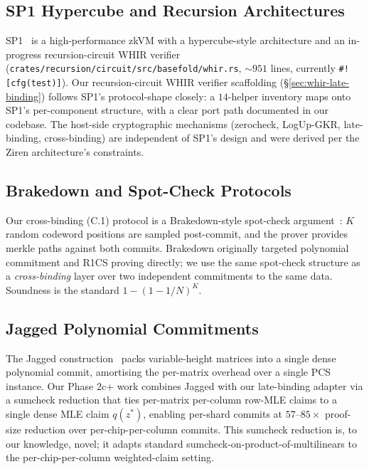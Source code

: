 \subsection{SP1 Hypercube and Recursion Architectures}

SP1~\cite{sp1-hypercube} is a high-performance zkVM with a
hypercube-style architecture and an in-progress recursion-circuit
WHIR verifier (\texttt{crates/recursion/circuit/src/basefold/whir.rs},
$\sim 951$ lines, currently \texttt{\#![cfg(test)]}).  Our
recursion-circuit WHIR verifier scaffolding (\S\ref{sec:whir-late-binding})
follows SP1's protocol-shape closely: a $14$-helper inventory
maps onto SP1's per-component structure, with a clear port path
documented in our codebase.  The host-side cryptographic mechanisms
(zerocheck, LogUp-GKR, late-binding, cross-binding) are independent
of SP1's design and were derived per the Ziren architecture's
constraints.

\subsection{Brakedown and Spot-Check Protocols}

Our cross-binding (C.1) protocol is a Brakedown-style spot-check
argument~\cite{brakedown}: $K$ random codeword positions are sampled
post-commit, and the prover provides merkle paths against both
commits.  Brakedown originally targeted polynomial commitment and
R1CS proving directly; we use the same spot-check structure as a
\emph{cross-binding} layer over two independent commitments to the
same data.  Soundness is the standard $1 - (1 - 1/N)^K$.

\subsection{Jagged Polynomial Commitments}

The Jagged construction~\cite{jagged} packs variable-height matrices
into a single dense polynomial commit, amortising the per-matrix
overhead over a single PCS instance.  Our Phase 2c+ work combines
Jagged with our late-binding adapter via a sumcheck reduction that
ties per-matrix per-column row-MLE claims to a single dense MLE
claim $q(z^*)$, enabling per-shard commits at $57$--$85\times$
proof-size reduction over per-chip-per-column commits.  This sumcheck
reduction is, to our knowledge, novel; it adapts standard
sumcheck-on-product-of-multilinears to the per-chip-per-column
weighted-claim setting.
